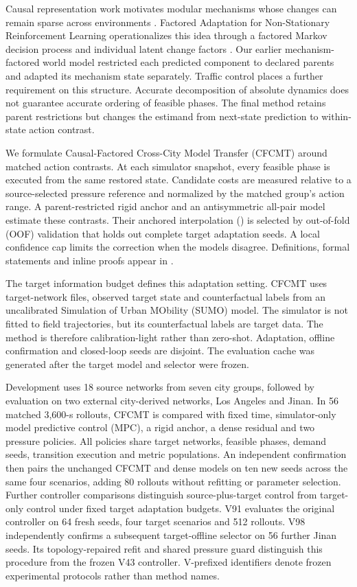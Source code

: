 Causal representation work motivates modular mechanisms whose changes can
remain sparse across environments
\citep{bengio2019meta,scholkopf2021causal}.  Factored Adaptation for
Non-Stationary Reinforcement Learning operationalizes this idea through a
factored Markov decision process and individual latent change factors
\citep{feng2022factored}.  Our earlier mechanism-factored world model
restricted each predicted component to declared parents and adapted its
mechanism state separately.  Traffic control places a further requirement on
this structure.  Accurate decomposition of absolute dynamics does not
guarantee accurate ordering of feasible phases.  The final method retains
parent restrictions but changes the estimand from next-state prediction to
within-state action contrast.

We formulate Causal-Factored Cross-City Model Transfer (CFCMT) around matched
action contrasts.  At each simulator snapshot, every feasible phase is
executed from the same restored state.  Candidate costs are measured relative
to a source-selected pressure reference and normalized by the matched group's
action range.  A parent-restricted rigid anchor and an antisymmetric all-pair
model estimate these contrasts.  Their anchored interpolation
() is selected by out-of-fold (OOF) validation that
holds out complete target adaptation seeds.  A local confidence cap limits
the correction when the models disagree.  Definitions, formal statements and
inline proofs appear in
.

The target information budget defines this adaptation setting.  CFCMT uses
target-network files, observed target state and counterfactual labels from an
uncalibrated Simulation of Urban MObility (SUMO) model.  The simulator is not
fitted to field trajectories, but its counterfactual labels are target data.
The method is therefore calibration-light rather than zero-shot.  Adaptation,
offline confirmation and closed-loop seeds are disjoint.  The evaluation cache
was generated after the target model and selector were frozen.

Development uses 18 source networks from seven city groups, followed by
evaluation on two external city-derived networks, Los Angeles and Jinan.
In 56 matched 3,600-s rollouts, CFCMT is compared with fixed time,
simulator-only model predictive control (MPC), a rigid anchor, a dense
residual and two pressure policies.  All policies share target networks,
feasible phases, demand seeds, transition execution and metric populations.
An independent confirmation then pairs the unchanged CFCMT and dense models
on ten new seeds across the same four scenarios, adding 80 rollouts without
refitting or parameter selection.
Further controller comparisons distinguish source-plus-target control from
target-only control under fixed target adaptation budgets.  V91 evaluates
the original controller on 64 fresh seeds, four target scenarios and 512
rollouts.  V98 independently confirms a subsequent target-offline selector
on 56 further Jinan seeds.  Its topology-repaired refit and shared pressure
guard distinguish this procedure from the frozen V43 controller.  V-prefixed
identifiers denote frozen experimental protocols rather than method names.


